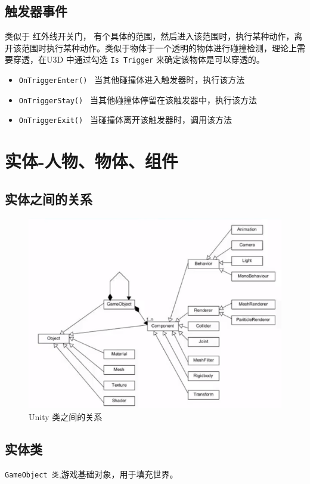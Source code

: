 \documentclass[UTF8,a4paper,12pt]{ctexbook}
\begin{document}
	\section{触发器事件}
		类似于 红外线开关门， 有个具体的范围，然后进入该范围时，执行某种动作，离开该范围时执行某种动作。类似于物体于一个透明的物体进行碰撞检测，理论上需要穿透，在U3D 中通过勾选 \verb|Is Trigger| 来确定该物体是可以穿透的。
		
		\begin{itemize}
			\item \verb|OnTriggerEnter() | 当其他碰撞体进入触发器时，执行该方法
			\item \verb|OnTriggerStay() | 当其他碰撞体停留在该触发器中，执行该方法
			\item \verb|OnTriggerExit() | 当碰撞体离开该触发器时，调用该方法
		\end{itemize}
		

\chapter{实体-人物、物体、组件}
	
	\section{实体之间的关系}
		\begin{figure}[H]
			\centering
			\includegraphics[scale=0.5]{class}
			\caption{Unity 类之间的关系}
		\end{figure}	
		
	\section{实体类} \verb|GameObject 类|,游戏基础对象，用于填充世界。
\end{document}
